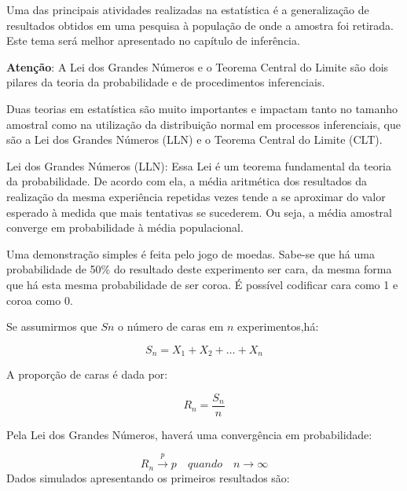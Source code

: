 \documentclass[
]{book}
\newenvironment{Shaded}{\begin{snugshade}}{\end{snugshade}}
\newcommand{\KeywordTok}[1]{\textcolor[rgb]{0.13,0.29,0.53}{\textbf{#1}}}
\newcommand{\NormalTok}[1]{#1}
\newcommand{\OperatorTok}[1]{\textcolor[rgb]{0.81,0.36,0.00}{\textbf{#1}}}
\newcommand{\StringTok}[1]{\textcolor[rgb]{0.31,0.60,0.02}{#1}}
\begin{document}
Uma das principais atividades realizadas na estatística é a generalização de resultados obtidos em uma pesquisa à população de onde a amostra foi retirada. Este tema será melhor apresentado no capítulo de inferência.

\begin{warning}

\textbf{Atenção}: A Lei dos Grandes Números e o Teorema Central do Limite são dois pilares da teoria da probabilidade e de procedimentos inferenciais.

\end{warning}

Duas teorias em estatística são muito importantes e impactam tanto no tamanho amostral como na utilização da distribuição normal em processos inferenciais, que são a Lei dos Grandes Números (LLN) e o Teorema Central do Limite (CLT).

Lei dos Grandes Números (LLN): Essa Lei é um teorema fundamental da teoria da probabilidade. De acordo com ela, a média aritmética dos resultados da realização da mesma experiência repetidas vezes tende a se aproximar do valor esperado à medida que mais tentativas se sucederem. Ou seja, a média amostral converge em probabilidade à média populacional.

Uma demonstração simples é feita pelo jogo de moedas. Sabe-se que há uma probabilidade de 50\% do resultado deste experimento ser cara, da mesma forma que há esta mesma probabilidade de ser coroa. É possível codificar cara como 1 e coroa como 0.

Se assumirmos que \(Sn\) o número de caras em \(n\) experimentos,há:

\[S_n = X_1 + X_2 + \dots + X_n\]

A proporção de caras é dada por:

\[R_n = \frac{S_n}{n}\]

Pela Lei dos Grandes Números, haverá uma convergência em probabilidade:

\[R_n \overset{p}{\to} p\quad quando \quad n \rightarrow \infty \]
Dados simulados apresentando os primeiros resultados são:

\begin{Shaded}
\end{Shaded}
\end{document}
